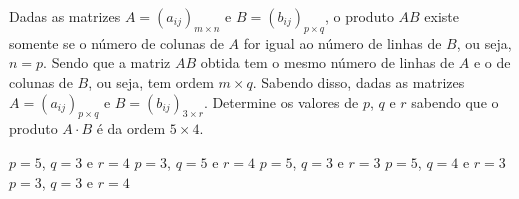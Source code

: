 Dadas as matrizes $A=(a_{ij})_{m\times n}$ e $B=(b_{ij})_{p\times q}$, o produto $AB$ existe somente se o número de colunas de $A$ for igual ao número de linhas de $B$, ou seja, $n=p$. Sendo que a matriz $AB$ obtida tem o mesmo número de linhas de $A$ e o de colunas de $B$, ou seja, tem ordem $m\times q$. Sabendo disso, dadas as matrizes $A=(a_{ij})_{p\times q}$ e $B=(b_{ij})_{3\times r}$. Determine os valores de $p$, $q$ e $r$ sabendo que o produto $A\cdot B$ é da ordem $5\times 4$.

$p=5$, $q=3$ e $r=4$
$p=3$, $q=5$ e $r=4$
$p=5$, $q=3$ e $r=3$
$p=5$, $q=4$ e $r=3$
$p=3$, $q=3$ e $r=4$


